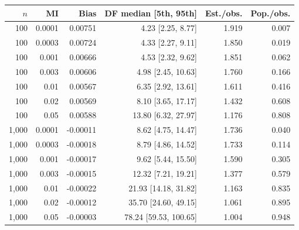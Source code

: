 \begin{tabular}{@{}rrrrrr@{}}\toprule
\(n\) & MI & Bias & DF median [5th, 95th] & Est./obs. & Pop./obs.\\\midrule
100 & 0.0001 & 0.00751 & 4.23 [2.25, 8.77] & 1.919 & 0.007\\
100 & 0.0003 & 0.00724 & 4.33 [2.27, 9.11] & 1.850 & 0.019\\
100 & 0.001 & 0.00666 & 4.53 [2.32, 9.62] & 1.851 & 0.062\\
100 & 0.003 & 0.00606 & 4.98 [2.45, 10.63] & 1.760 & 0.166\\
100 & 0.01 & 0.00567 & 6.35 [2.92, 13.61] & 1.611 & 0.416\\
100 & 0.02 & 0.00569 & 8.10 [3.65, 17.17] & 1.432 & 0.608\\
100 & 0.05 & 0.00588 & 13.80 [6.32, 27.97] & 1.176 & 0.808\\
1,000 & 0.0001 & -0.00011 & 8.62 [4.75, 14.47] & 1.736 & 0.040\\
1,000 & 0.0003 & -0.00018 & 8.79 [4.86, 14.52] & 1.733 & 0.114\\
1,000 & 0.001 & -0.00017 & 9.62 [5.44, 15.50] & 1.590 & 0.305\\
1,000 & 0.003 & -0.00015 & 12.32 [7.21, 19.21] & 1.377 & 0.579\\
1,000 & 0.01 & -0.00022 & 21.93 [14.18, 31.82] & 1.163 & 0.835\\
1,000 & 0.02 & -0.00012 & 35.70 [24.60, 49.15] & 1.061 & 0.895\\
1,000 & 0.05 & -0.00003 & 78.24 [59.53, 100.65] & 1.004 & 0.948\\
\bottomrule\end{tabular}
